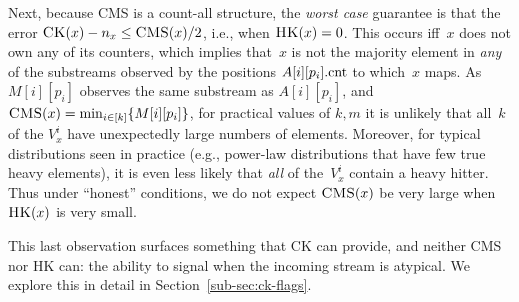 Next, because CMS is a count-all structure, the \emph{worst case} guarantee is that the error $\textnormal{\textsc{CK}}(x)-n_x \leq \textnormal{\textsc{CMS}}(x)/2$, i.e., when $\textnormal{\textsc{HK}}(x)=0$.  This occurs iff~$x$ does not own any of its counters, which implies that~$x$ is not the majority element in \emph{any} of the substreams observed by the positions $A[i][p_i].\textup{cnt}$ to which~$x$ maps. 
As $M[i][p_i]$ observes the same substream as $A[i][p_i]$, and $\CMS(x)=\allowdisplaybreaks\min_{i \in [k]}\{M[i][p_i]\}$, for practical values of $k,m$ it is unlikely that all~$k$ of the $V^i_x$ have unexpectedly large numbers of elements.  Moreover, for typical distributions seen in practice (e.g., power-law distributions that have few true heavy elements), it is even less likely that \emph{all} of the~$V^i_x$ contain a heavy hitter.  Thus under ``honest'' conditions, we do not expect $\textnormal{\textsc{CMS}}(x)$ be very large when $\textnormal{\textsc{HK}}(x)$ is very small.

This last observation surfaces something that CK can provide, and neither CMS nor HK can: the ability to signal when the incoming stream is atypical. We explore this in detail in Section~\ref{sub-sec:ck-flags}.



